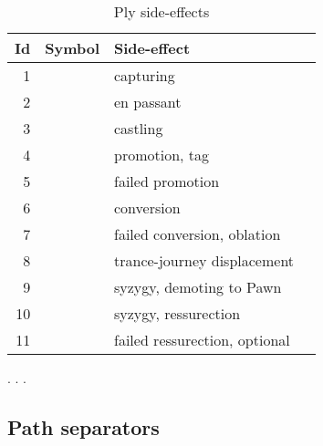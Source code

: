 \begin{table}[!h]
\centering
\begin{tabular}{ rlll }
\toprule
\textbf{Id} & \textbf{Symbol}      & \textbf{Side-effect}                   \\
\midrule
1           & \alg{*}              & capturing                              \\
2           & \alg{:}              & en passant                             \\
3           & \alg{\&}             & castling                               \\
4           & \alg{=}              & promotion, tag                         \\
5           & \alg{==}             & failed promotion                       \\
6           & \alg{\%}             & conversion                             \\
7           & \alg{\%\%}           & failed conversion, oblation            \\
8           & \alg{<}              & trance-journey displacement            \\
9           & \alg{>}              & syzygy, demoting to Pawn               \\
10          & \alg{\$}             & syzygy, ressurection                   \\
11          & \alg{\$\$}           & failed ressurection, optional          \\
\bottomrule
\end{tabular}
\caption{Ply side-effects}
\label{tbl:Appendix/Ply side-effects}
\end{table}

. . .

\clearpage %

\subsection*{Path separators}
\label{sec:Appendix/Path separators}

